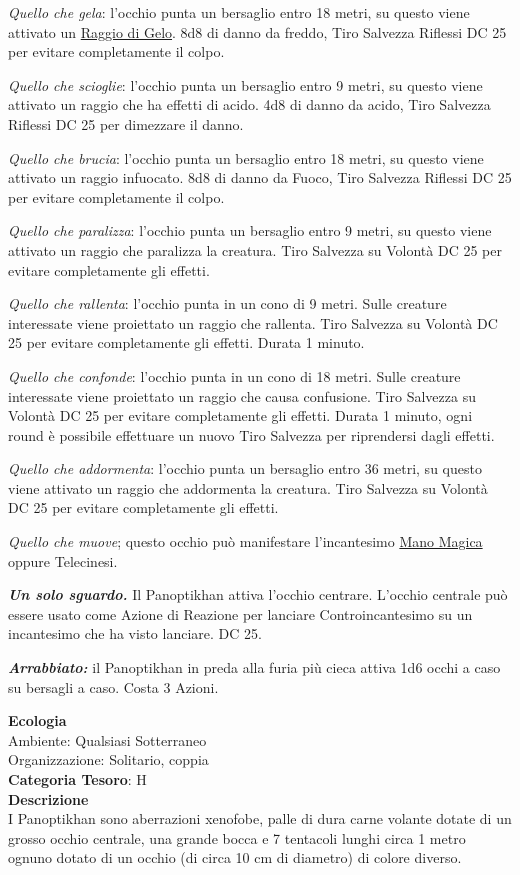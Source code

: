 \begin{multicols}{2}
{\emph{Quello che gela}: l'occhio punta un bersaglio entro 18 metri, su questo viene attivato un \hyperlink{Raggio di Gelo}{Raggio di Gelo}. 8d8 di danno da freddo, Tiro Salvezza Riflessi DC 25 per evitare completamente il colpo.

\emph{Quello che scioglie}: l'occhio punta un bersaglio entro 9 metri, su questo viene attivato un raggio che ha effetti di acido. 4d8 di danno da acido, Tiro Salvezza Riflessi DC 25 per dimezzare il danno.

\emph{Quello che brucia}: l'occhio punta un bersaglio entro 18 metri, su questo viene attivato un raggio infuocato. 8d8 di danno da Fuoco, Tiro Salvezza Riflessi DC 25 per evitare completamente il colpo.

\emph{Quello che paralizza}: l'occhio punta un bersaglio entro 9 metri, su questo viene attivato un raggio che paralizza la creatura. Tiro Salvezza su Volontà DC 25 per evitare completamente gli effetti.

\emph{Quello che rallenta}: l'occhio punta in un cono di 9 metri. Sulle creature interessate viene proiettato un raggio che rallenta. Tiro Salvezza su Volontà DC 25 per evitare completamente gli effetti. Durata 1 minuto.

\emph{Quello che confonde}: l'occhio punta in un cono di 18 metri. Sulle creature interessate viene proiettato un raggio che causa confusione. Tiro Salvezza su Volontà DC 25 per evitare completamente gli effetti. Durata 1 minuto, ogni round è possibile effettuare un nuovo Tiro Salvezza per riprendersi dagli effetti.

\emph{Quello che addormenta}: l'occhio punta un bersaglio entro 36 metri, su questo viene attivato un raggio che addormenta la creatura. Tiro Salvezza su Volontà DC 25 per evitare completamente gli effetti.

\emph{Quello che muove}; questo occhio può manifestare l'incantesimo \hyperlink{Mano Magica}{Mano Magica} oppure Telecinesi.

\emph{\textbf{Un solo sguardo.}} Il Panoptikhan attiva l'occhio centrare. L'occhio centrale può essere usato come Azione di Reazione per lanciare Controincantesimo su un incantesimo che ha visto lanciare. DC 25.

\emph{\textbf{Arrabbiato:}} il Panoptikhan in preda alla furia più cieca attiva 1d6 occhi a caso su bersagli a caso. Costa 3 Azioni.

\textbf{Ecologia}\\
Ambiente: Qualsiasi Sotterraneo\\
Organizzazione: Solitario, coppia\\
\textbf{Categoria Tesoro}: H\\
\textbf{Descrizione}\\
I Panoptikhan sono aberrazioni xenofobe, palle di dura carne volante dotate di un grosso occhio centrale, una grande bocca e 7 tentacoli lunghi circa 1 metro ognuno dotato di un occhio (di circa 10 cm di diametro) di colore diverso.

}
\end{multicols}
